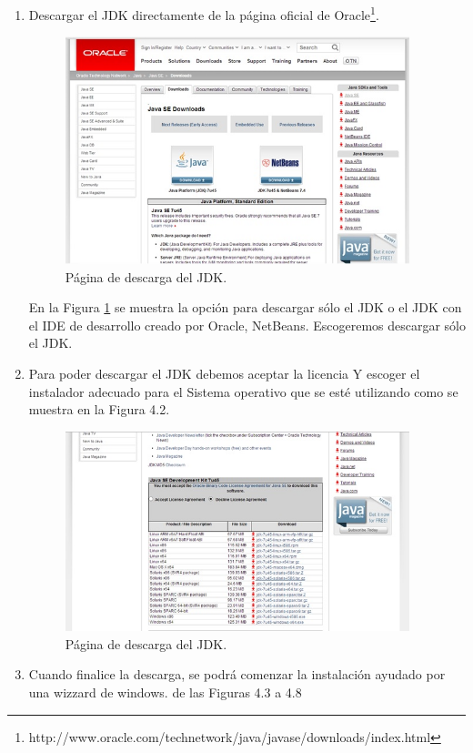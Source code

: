 \documentclass[12pt]{book} %
\begin{document}
\begin{enumerate}
\item Descargar el JDK directamente de la página oficial de Oracle\footnote{http://www.oracle.com/technetwork/java/javase/downloads/index.html}.

\begin{figure}[!hbp]
		\centering
			\includegraphics[width=10cm]{ins1.jpg}
			\caption{Página de descarga del JDK.}
			\label{fig1}
		
	\end{figure}
En la Figura \ref{fig1} se muestra la opción para descargar sólo el JDK o el JDK con el IDE de desarrollo creado por Oracle, NetBeans. Escogeremos descargar sólo el JDK.
	
	
	
\item Para poder descargar el JDK debemos aceptar la licencia Y escoger el instalador adecuado para el Sistema operativo que se esté utilizando como se muestra en la Figura 4.2.

	\begin{figure}[!hbp]
		\centering
			\includegraphics[width=10cm]{ins2.jpg}
			\caption{Página de descarga del JDK.}
		
	\end{figure}

\item Cuando finalice la descarga, se podrá comenzar la instalación ayudado por una wizzard de windows. de las Figuras 4.3 a 4.8


\end{enumerate}
\end{document}
